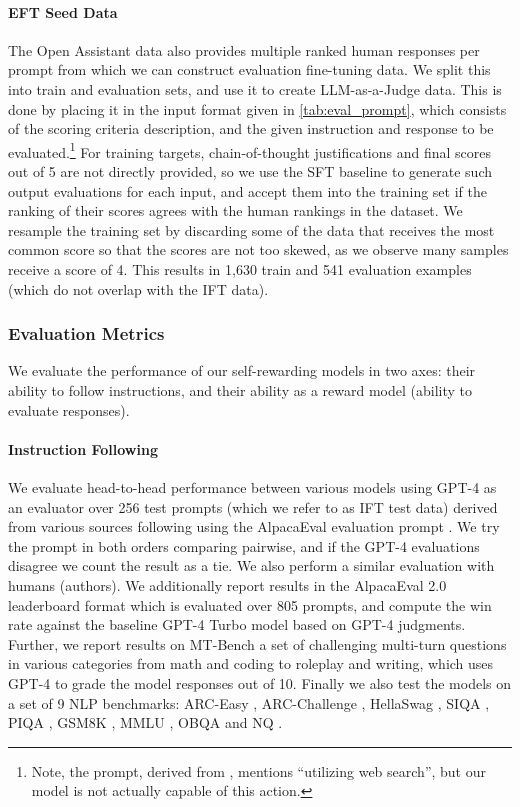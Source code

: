 \documentclass{article}
\begin{document}
\paragraph{EFT Seed Data} The Open Assistant data also provides multiple ranked human responses per prompt  from which we can construct evaluation fine-tuning data. We split this into train and evaluation sets, and use it to create LLM-as-a-Judge data. This is done by placing it in the input format given in \autoref{tab:eval_prompt}, which consists of the scoring criteria description, and the given instruction and response to be evaluated.\footnote{Note, the prompt, derived from  \citet{li2023self}, mentions ``utilizing web search'', but our model is not actually capable of this action.} For training targets, chain-of-thought justifications and final scores out of 5 are not directly provided, so we use the SFT baseline to generate such output evaluations for each input, %
and accept them into the training set if the ranking of their scores agrees with the human rankings in the dataset. We resample the training set by discarding some of the data that receives the most common score so that the scores are not too skewed, as we observe many samples receive a score of 4. This results in 1,630 train and 541 evaluation examples (which do not overlap with the IFT data).

\subsubsection{Evaluation Metrics}

We evaluate the performance of our self-rewarding models in two axes:
 their ability to follow instructions, and their ability
 as a reward model (ability to evaluate responses).
  
\paragraph{Instruction Following}
We evaluate head-to-head performance between various models using GPT-4 \citep{achiam2023gpt} as an evaluator over 256 test prompts (which we refer to as IFT test data) derived from various sources following \citet{li2023self} using the AlpacaEval evaluation prompt \citep{alpaca_eval}. We try the prompt in both orders comparing pairwise, and if the GPT-4 evaluations disagree we count the result as a tie.
We also perform a similar evaluation with humans (authors).
We additionally report results in the  AlpacaEval 2.0 leaderboard format which is evaluated over 805  prompts, and compute the win rate against the baseline GPT-4 Turbo model based on GPT-4 judgments. Further, we report results on MT-Bench \citep{zheng2023judging} a set of challenging multi-turn questions in various categories from math and coding to roleplay and writing, which uses GPT-4 to grade the model responses out of 10.
Finally we also test the models on a set of 9 NLP benchmarks: ARC-Easy \citep{Clark2018ThinkYH}, ARC-Challenge \citep{Clark2018ThinkYH}, HellaSwag \citep{DBLP:conf/acl/ZellersHBFC19}, SIQA \citep{DBLP:journals/corr/abs-1904-09728}, PIQA \citep{Bisk2020}, GSM8K \citep{cobbe2021gsm8k}, MMLU \citep{DBLP:conf/iclr/HendrycksBBZMSS21}, OBQA \citep{OpenBookQA2018} 
and NQ \citep{47761}. 
\end{document}

